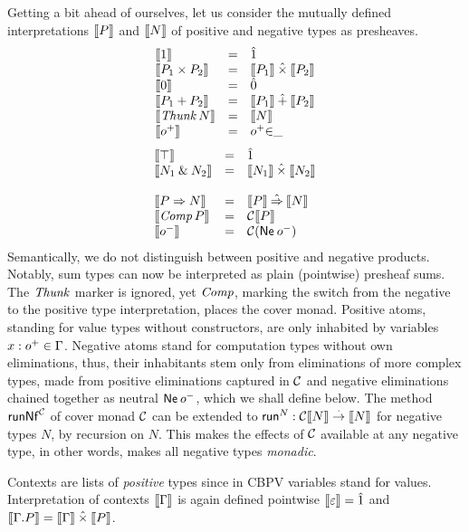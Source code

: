 \documentclass[sigplan,screen,fleqn]{acmart}
\begin{document}
Getting a bit ahead of ourselves, let us consider the
mutually defined interpretations
$\den P$ and $\den N$ of positive and negative types as presheaves.
\[
\begin{array}{lcl}
  \den{\tyone} & = & \hatone \\
  \den{P_1 \times P_2} & = & \den{P_1} \hattimes \den{P_2} \\
  \den{\tyzero} & = & \hatzero \\
  \den{P_1 + P_2} & = & \den{P_1} \hatplus \den{P_2} \\
  \den{\Thunk N} & = & \den N \\
  \den{\patom} & = & \patom{\in}\_ \\
\end{array}
\]
\[
\begin{array}{lcl}
  \den{\top} & = & \hatone \\
  \den{N_1 \ntimes N_2} & = & \den{N_1} \hattimes \den{N_2} \\
  \\
  \den{P \To N} & = & \den P \hatto \den N \\
  \den{\Comp P} & = & \C \den P \\
  \den{\natom}  & = & \C (\tNe\, \natom) \\
\end{array}
\]
Semantically, we do not distinguish between positive and negative
products.  Notably, sum types can now be interpreted as plain
(pointwise) presheaf
sums.  The $\tThunk$ marker is ignored, yet $\tComp$, marking the
switch from the negative to the positive type interpretation, places
the cover monad.  Positive atoms, standing for value types without
constructors, are only inhabited by variables $x : \patom \in \Gamma$.
Negative atoms stand for computation types without own eliminations,
thus, their inhabitants stem only from eliminations of more complex
types, made from positive eliminations captured in $\C$ and negative
eliminations chained together as neutral $\tNe\,\natom$, which we
shall define below.
The method $\trunNf[\C]$ of cover monad $\C$ can be extended to
$\trun^N : \C \den N \todot \den N$ for negative types $N$, by recursion
on $N$.
This makes the effects of $\C$ available at any negative type,
in other words, makes all negative types \emph{monadic}.

Contexts are lists of \emph{positive} types since in CBPV variables stand
for values.  Interpretation of contexts $\den \Gamma$ is again defined
pointwise $\den \cempty = \hatone$ and
$\den{\cext \Gamma P} = \den \Gamma \hattimes \den P$.
\end{document}

